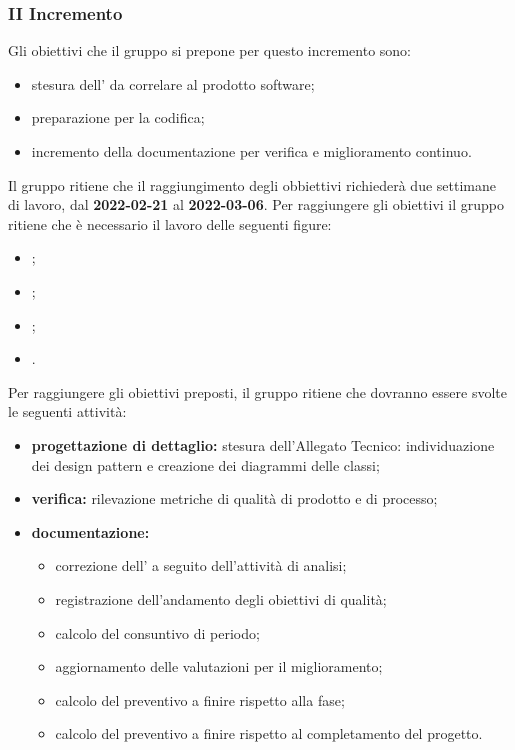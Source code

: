 \pagebreak

\subsubsection{II Incremento}
Gli obiettivi che il gruppo si prepone per questo incremento sono:
\begin{itemize}
	\item stesura dell'\AT{} da correlare al prodotto software;
	\item preparazione per la codifica;
 \item incremento della documentazione per verifica e miglioramento continuo.
\end{itemize}
Il gruppo ritiene che il raggiungimento degli obbiettivi richiederà due settimane di lavoro, dal \textbf{2022-02-21} al \textbf{2022-03-06}.
Per raggiungere gli obiettivi il gruppo ritiene che è necessario il lavoro delle seguenti figure:
\begin{itemize}
	\item \RE{};
 	\item \AM{};
   	\item \PT{};
   	\item \VE{}.
\end{itemize}
Per raggiungere gli obiettivi preposti, il gruppo ritiene che dovranno essere svolte le seguenti attività:
\begin{itemize}
	\item \textbf{progettazione di dettaglio:} stesura dell’Allegato Tecnico: individuazione dei design pattern e creazione dei diagrammi delle classi;
 	\item \textbf{verifica:} rilevazione metriche di qualità di prodotto e di processo;
	\item \textbf{documentazione:} 
	 \begin{itemize}
		 \item correzione dell’\AdR{} a seguito dell’attività di analisi;
		   \item registrazione dell’andamento degli obiettivi di qualità;
		   \item calcolo del consuntivo di periodo;
		  \item aggiornamento delle valutazioni per il miglioramento; 
		  \item calcolo del preventivo a finire rispetto alla fase;
			\item calcolo del preventivo a finire rispetto al completamento del progetto.
	 \end{itemize}
\end{itemize}

